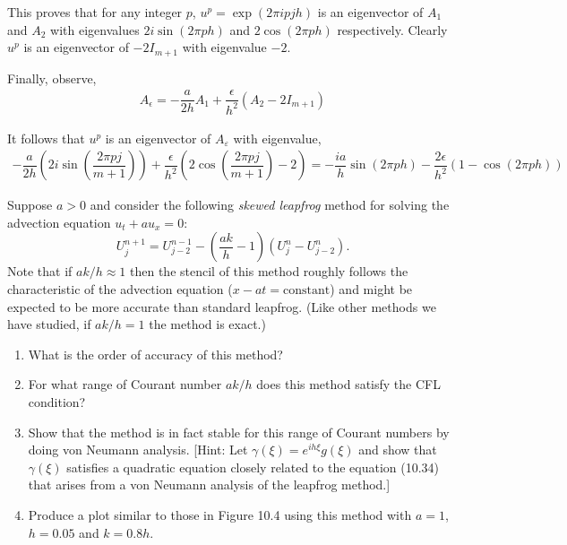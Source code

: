 \documentclass[10pt]{article}
\begin{document}
\begin{solution}[Solution]
This proves that for any integer \( p \), \( u^p = \exp(2\pi i p j h) \) is an eigenvector of \( A_1 \) and \( A_2 \) with eigenvalues \( 2i\sin(2\pi p h) \) and \( 2\cos(2\pi p h) \) respectively. Clearly \( u^p \) is an eigenvector of \( -2I_{m+1} \) with eigenvalue \( -2 \).

Finally, observe,
\begin{align*}
    A_{\epsilon} = -\dfrac{a}{2h}A_1 + \dfrac{\epsilon}{h^2} \left( A_2-2 I_{m+1} \right)
\end{align*}

It follows that \( u^p \) is an eigenvector of \( A_\varepsilon \) with eigenvalue,
\begin{align*}
    -\dfrac{a}{2h} \left( 2i\sin \left( \dfrac{2\pi p j}{m+1} \right)  \right) + \dfrac{\epsilon}{h^2} \left( 2 \cos \left( \dfrac{2\pi p j}{m+1} \right)-2 \right) = -\dfrac{ia}{h}\sin(2\pi p h) - \dfrac{2\epsilon}{h^2}\left( 1-\cos(2\pi p h) \right) \tag*{\qed}
\end{align*}


\end{solution}

\begin{problem}[Problem 2]
Suppose \(a > 0\) and consider the following {\em skewed leapfrog} method for solving the advection equation \(u_t + a u_x = 0\):
\[
U_j^{n+1} = U_{j-2}^{n-1} - \left( \frac{ak}{h} - 1 \right) ( U_j^n - U_{j-2}^n ) .
\]
Note that if \(ak/h \approx 1\) then the stencil of this method roughly follows the characteristic of the advection equation (\(x-at = \mbox{constant}\)) and might be expected to be more accurate than standard leapfrog.  (Like other methods we have studied, if \(ak/h = 1\) the method is exact.)
\begin{enumerate}[label=(\alph*)]
\item What is the order of accuracy of this method?
\item For what range of Courant number \(ak/h\) does this method satisfy the CFL condition?
\item Show that the method is in fact stable for this range of Courant numbers by doing von Neumann analysis.
[Hint:  Let \(\gamma ( \xi ) = e^{i h \xi} g( \xi )\) and show that \(\gamma ( \xi )\) satisfies a quadratic equation closely related to the equation (10.34) that arises from a von Neumann analysis of the leapfrog method.]
\item Produce a plot similar to those in Figure 10.4 using this method with \(a=1\), \(h=0.05\) and \(k=0.8 h\).
\end{enumerate}
\end{problem}
\end{document}
